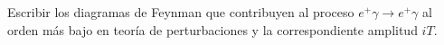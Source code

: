 Escribir los diagramas de Feynman que contribuyen al proceso $e^{+} \gamma \rightarrow e^{+} \gamma$  al orden más bajo en teoría de perturbaciones y la correspondiente amplitud $iT$.

\begin{solution}\ \\

\end{solution}